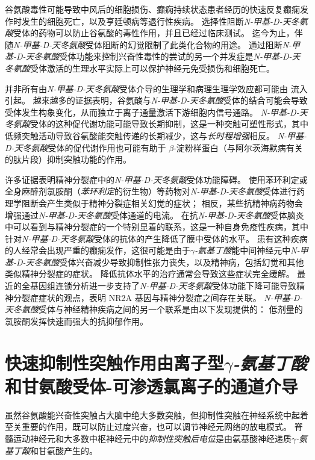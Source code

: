 谷氨酸毒性可能导致中风后的细胞损伤、癫痫持续状态患者经历的快速反复癫痫发作时发生的细胞死亡，以及亨廷顿病等退行性疾病。
选择性阻断\textit{N-甲基-D-天冬氨酸}受体的药物可以防止谷氨酸的毒性作用，并且已经过临床测试。
迄今为止，伴随\textit{N-甲基-D-天冬氨酸}受体阻断的幻觉限制了此类化合物的用途。
通过阻断\textit{N-甲基-D-天冬氨酸}受体功能来控制兴奋性毒性的尝试的另一个并发症是\textit{N-甲基-D-天冬氨酸}受体激活的生理水平实际上可以保护神经元免受损伤和细胞死亡。


并非所有由\textit{N-甲基-D-天冬氨酸}受体介导的生理学和病理生理学效应都可能由  流入引起。
越来越多的证据表明，谷氨酸与\textit{N-甲基-D-天冬氨酸}受体的结合可能会导致受体发生构象变化，从而独立于离子通量激活下游细胞内信号通路。 
\textit{N-甲基-D-天冬氨酸}受体的这种促代谢功能可能导致长期抑制，这是一种突触可塑性形式，其中低频突触活动导致谷氨酸能突触传递的长期减少，这与\textit{长时程增强}相反。
\textit{N-甲基-D-天冬氨酸}受体的促代谢作用也可能有助于 $\beta$-淀粉样蛋白（与阿尔茨海默病有关的肽片段）抑制突触功能的作用。


许多证据表明精神分裂症中的\textit{N-甲基-D-天冬氨酸}受体功能障碍。
使用苯环利定或全身麻醉剂氯胺酮（\textit{苯环利定}的衍生物）等药物对\textit{N-甲基-D-天冬氨酸}受体进行药理学阻断会产生类似于精神分裂症相关幻觉的症状；
相反，某些抗精神病药物会增强通过\textit{N-甲基-D-天冬氨酸}受体通道的电流。
在抗\textit{N-甲基-D-天冬氨酸}受体脑炎中可以看到与精神分裂症的一个特别显着的联系，这是一种自身免疫性疾病，其中针对\textit{N-甲基-D-天冬氨酸}受体的抗体的产生降低了膜中受体的水平。
患有这种疾病的人经常会出现严重的癫痫发作，这很可能是由于\textit{$\gamma$-氨基丁酸}能中间神经元中\textit{N-甲基-D-天冬氨酸}受体兴奋减少导致抑制性张力丧失，以及精神病，包括幻觉和其他类似精神分裂症的症状。
降低抗体水平的治疗通常会导致这些症状完全缓解。
最近的全基因组连锁分析进一步支持了\textit{N-甲基-D-天冬氨酸}受体功能下降可能导致精神分裂症症状的观点，表明 NR2A 基因与精神分裂症之间存在关联。
\textit{N-甲基-D-天冬氨酸}受体与神经精神疾病之间的另一个联系是由以下发现提供的：
低剂量的氯胺酮发挥快速而强大的抗抑郁作用。



\section{快速抑制性突触作用由离子型\textit{$\gamma$-氨基丁酸}和甘氨酸受体-可渗透氯离子的通道介导}

虽然谷氨酸能兴奋性突触占大脑中绝大多数突触，但抑制性突触在神经系统中起着至关重要的作用，既可以防止过度兴奋，也可以调节神经元网络的放电模式。
脊髓运动神经元和大多数中枢神经元中的\textit{抑制性突触后电位}是由氨基酸神经递质\textit{$\gamma$-氨基丁酸}和甘氨酸产生的。


